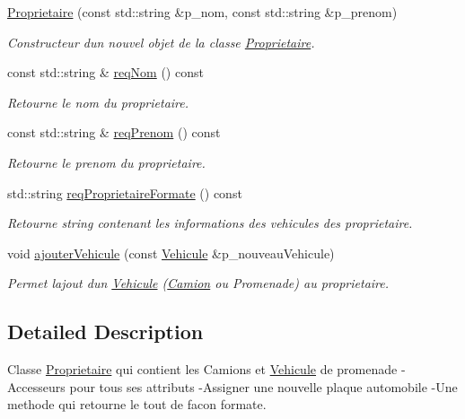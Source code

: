 \begin{DoxyCompactItemize}
\item 
\hyperlink{classsaaq_1_1Proprietaire_af70905a8a13010db6d3b88f1f9ad5ffd}{Proprietaire} (const std\+::string \&p\+\_\+nom, const std\+::string \&p\+\_\+prenom)
\begin{DoxyCompactList}\small\item\em Constructeur d\textquotesingle{}un nouvel objet de la classe \hyperlink{classsaaq_1_1Proprietaire}{Proprietaire}. \end{DoxyCompactList}\item 
const std\+::string \& \hyperlink{classsaaq_1_1Proprietaire_aed34cc351d73ce99c9cccc24badc2191}{req\+Nom} () const
\begin{DoxyCompactList}\small\item\em Retourne le nom du proprietaire. \end{DoxyCompactList}\item 
const std\+::string \& \hyperlink{classsaaq_1_1Proprietaire_a12480a6a2c063c3447df4e334960d7c6}{req\+Prenom} () const
\begin{DoxyCompactList}\small\item\em Retourne le prenom du proprietaire. \end{DoxyCompactList}\item 
std\+::string \hyperlink{classsaaq_1_1Proprietaire_a808b18e9e9a6b1d3b7f24e78769c0474}{req\+Proprietaire\+Formate} () const
\begin{DoxyCompactList}\small\item\em Retourne string contenant les informations des vehicules des proprietaire. \end{DoxyCompactList}\item 
void \hyperlink{classsaaq_1_1Proprietaire_aa6f1af7fa9ee650bc96ff414c7923c49}{ajouter\+Vehicule} (const \hyperlink{classsaaq_1_1Vehicule}{Vehicule} \&p\+\_\+nouveau\+Vehicule)
\begin{DoxyCompactList}\small\item\em Permet l\textquotesingle{}ajout d\textquotesingle{}un \hyperlink{classsaaq_1_1Vehicule}{Vehicule} (\hyperlink{classsaaq_1_1Camion}{Camion} ou Promenade) au proprietaire. \end{DoxyCompactList}\end{DoxyCompactItemize}


\subsection{Detailed Description}
Classe \hyperlink{classsaaq_1_1Proprietaire}{Proprietaire} qui contient les Camions et \hyperlink{classsaaq_1_1Vehicule}{Vehicule} de promenade -\/\+Accesseurs pour tous ses attributs -\/\+Assigner une nouvelle plaque automobile -\/\+Une methode qui retourne le tout de facon formate. 

